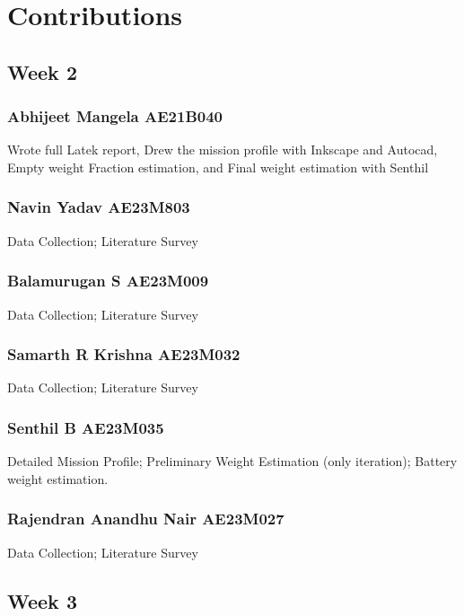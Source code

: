 \documentclass[12 pt]{article}
\begin{document}
\newpage


\section{Contributions}

\subsection{Week 2}

\subsubsection{Abhijeet Mangela AE21B040}
Wrote full Latek report, Drew the mission profile with Inkscape and Autocad, Empty weight Fraction estimation, and Final weight estimation with Senthil

\subsubsection{Navin Yadav AE23M803}

Data Collection; Literature Survey

\subsubsection{Balamurugan S AE23M009}

Data Collection; Literature Survey

\subsubsection{Samarth R Krishna AE23M032}

Data Collection; Literature Survey

\subsubsection{Senthil B AE23M035}

Detailed Mission Profile; Preliminary Weight Estimation (only iteration); Battery weight estimation.

\subsubsection{Rajendran Anandhu Nair AE23M027}

Data Collection; Literature Survey




\subsection{Week 3}
\end{document}
